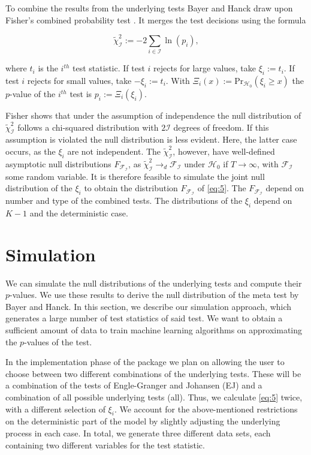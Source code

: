 \documentclass[12pt,a4paper]{article}
\begin{document}
To combine the results from the underlying tests Bayer and Hanck draw
upon Fisher's combined probability test \autocite{Fisher_1932}. It
merges the test decisions using the formula

\begin{equation}
\tilde{\chi}^2_{\mathcal{I}} := -2 \sum_{i \in \mathcal{I}} \ln{(p_i)},
\label{eq:5}
\end{equation}

where \(t_i\) is the \(i^{th}\) test statistic. If test \(i\) rejects
for large values, take \(\xi_i := t_i\). If test \(i\) rejects for small
values, take \(-\xi_i := t_i\). With
\(\Xi_i(x) := \text{Pr}_{\mathcal{H_0}}(\xi_i \geq x)\) the \(p\)-value
of the \(i^{th}\) test is \(p_i := \Xi_i(\xi_i)\).

Fisher shows that under the assumption of independence the null
distribution of \(\tilde{\chi}^2_{\mathcal{I}}\) follows a chi-squared
distribution with \(2\mathcal{I}\) degrees of freedom. If this
assumption is violated the null distribution is less evident. Here, the
latter case occurs, as the \(\xi_i\) are not independent. The
\(\tilde{\chi}^2_{\mathcal{I}}\), however, have well-defined asymptotic
null distributions \(F_{\mathcal{F_I}}\), as
\(\tilde{\chi}^2_{\mathcal{I}} \rightarrow_d \mathcal{F_I}\) under
\(\mathcal{H}_0\) if \(T \rightarrow \infty\), with \(\mathcal{F_I}\)
some random variable. It is therefore feasible to simulate the joint
null distribution of the \(\xi_i\) to obtain the distribution
\(F_{\mathcal{F_I}}\) of \eqref{eq:5}. The \(F_{\mathcal{F_I}}\) depend
on number and type of the combined tests. The distributions of the
\(\xi_i\) depend on \(K-1\) and the deterministic case.

\hypertarget{simulation}{%
\section{Simulation}\label{simulation}}

We can simulate the null distributions of the underlying tests and
compute their \(p\)-values. We use these results to derive the null
distribution of the meta test by Bayer and Hanck. In this section, we
describe our simulation approach, which generates a large number of test
statistics of said test. We want to obtain a sufficient amount of data
to train machine learning algorithms on approximating the \(p\)-values
of the test.

In the implementation phase of the package we plan on allowing the user
to choose between two different combinations of the underlying tests.
These will be a combination of the tests of Engle-Granger and Johansen
(EJ) and a combination of all possible underlying tests (all). Thus, we
calculate \eqref{eq:5} twice, with a different selection of \(\xi_i\).
We account for the above-mentioned restrictions on the deterministic
part of the model by slightly adjusting the underlying process in each
case. In total, we generate three different data sets, each containing
two different variables for the test statistic.
\end{document}

